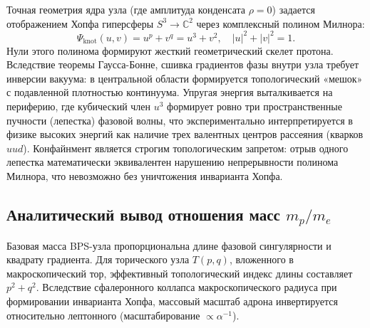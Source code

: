 \documentclass[12pt,a4paper]{article}
\begin{document}
Точная геометрия ядра узла (где амплитуда конденсата $\rho = 0$) задается отображением Хопфа гиперсферы $S^3 \to \mathbb{C}^2$ через комплексный полином Милнора:
\begin{equation}
\Psi_{\text{knot}}(u, v) = u^p + v^q = u^3 + v^2, \quad |u|^2 + |v|^2 = 1.
\end{equation}
Нули этого полинома формируют жесткий геометрический скелет протона. Вследствие теоремы Гаусса-Бонне, сшивка градиентов фазы внутри узла требует инверсии вакуума: в центральной области формируется топологический «мешок» с подавленной плотностью континуума. Упругая энергия выталкивается на периферию, где кубический член $u^3$ формирует ровно три пространственные пучности (лепестка) фазовой волны, что экспериментально интерпретируется в физике высоких энергий как наличие трех валентных центров рассеяния (кварков $uud$). Конфайнмент является строгим топологическим запретом: отрыв одного лепестка математически эквивалентен нарушению непрерывности полинома Милнора, что невозможно без уничтожения инварианта Хопфа.

\subsection{Аналитический вывод отношения масс $m_p/m_e$}
Базовая масса BPS-узла пропорциональна длине фазовой сингулярности и квадрату градиента. Для торического узла $T(p,q)$, вложенного в макроскопический тор, эффективный топологический индекс длины составляет $p^2 + q^2$. Вследствие сфалеронного коллапса макроскопического радиуса при формировании инварианта Хопфа, массовый масштаб адрона инвертируется относительно лептонного (масштабирование $\propto \alpha^{-1}$).
\end{document}
